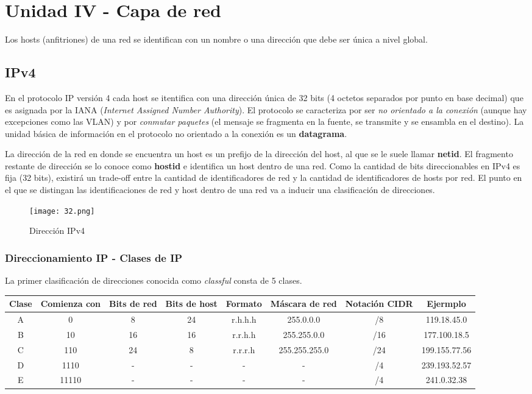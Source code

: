 \documentclass{book}
\begin{document}
	\chapter{Unidad IV - Capa de red}
	
	Los hosts (anfitriones) de una red se identifican con un nombre o una dirección que debe ser única a nivel global.
	
	\section{IPv4}
	En el protocolo IP versión 4 cada host se itentifica con una dirección única de 32 bits (4 octetos separados por punto en base decimal) que es asignada por la IANA (\textit{Internet Assigned Number Authority}). El protocolo se caracteriza por ser \textit{no orientado a la conexión} (aunque hay excepciones como las VLAN) y por \textit{conmutar paquetes} (el mensaje se fragmenta en la fuente, se transmite y se ensambla en el destino). La unidad básica de información en el protocolo no orientado a la conexión es un \textbf{datagrama}.
	
	\vspace{3mm}
	La dirección de la red en donde se encuentra un host es un prefijo de la dirección del host, al que se le suele llamar \textbf{netid}. El fragmento restante de dirección se lo conoce como \textbf{hostid} e identifica un host dentro de una red. Como la cantidad de bits direccionables en IPv4 es fija (32 bits), existirá un trade-off entre la cantidad de identificadores de red y la cantidad de identificadores de hosts por red. El punto en el que se distingan las identificaciones de red y host dentro de una red va a inducir una clasificación de direcciones.
	
	\begin{figure}[H]
		\centering
		\texttt{[image: 32.png]}
		\caption{Dirección IPv4}
	\end{figure}
	
	\subsection{Direccionamiento IP - Clases de IP}
	La primer clasificación de direcciones conocida como \textit{classful} consta de 5 clases.
	
	\begin{table}[H]
		\centering
		\begin{tabular}{|c|c|c|c|c|c|c|c|}
			\hline
			Clase&Comienza con&Bits de red&Bits de host&Formato&Máscara de red&Notación CIDR&Ejermplo\\
			\hline
			A&0&8&24&r.h.h.h&255.0.0.0&/8&119.18.45.0\\
			\hline
			B&10&16&16&r.r.h.h&255.255.0.0&/16&177.100.18.5\\
			\hline
			C&110&24&8&r.r.r.h&255.255.255.0&/24&199.155.77.56\\
			\hline
			D&1110&-&-&-&-&/4&239.193.52.57\\
			\hline
			E&11110&-&-&-&-&/4&241.0.32.38\\
			\hline
		\end{tabular}
	\end{table}
	
\end{document}
